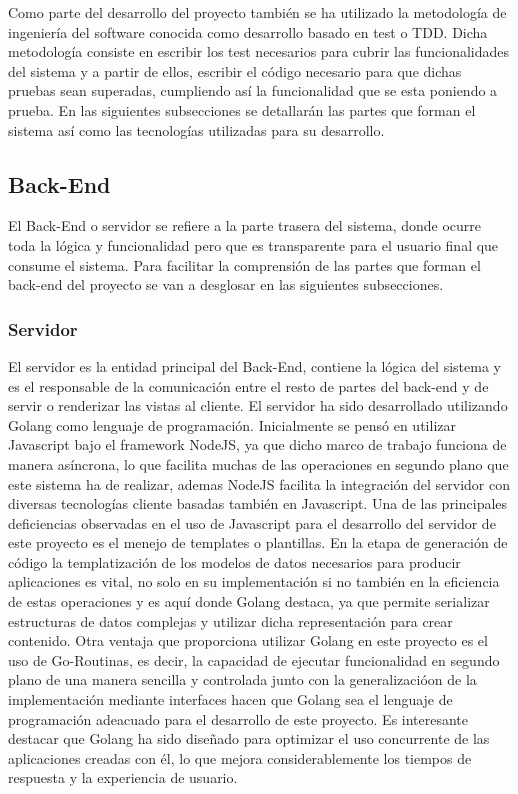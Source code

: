 \documentclass[a4paper,11pt]{book}
\begin{document}
Como parte del desarrollo del proyecto también se ha utilizado la metodología de ingeniería del software conocida como desarrollo basado en test o TDD. Dicha metodología consiste en escribir los test necesarios para cubrir las funcionalidades del sistema y a partir de ellos, escribir el código necesario para que dichas pruebas sean superadas, cumpliendo así la funcionalidad que se esta poniendo a prueba.  En las siguientes subsecciones se detallarán las partes que forman el sistema así como las tecnologías utilizadas para su desarrollo. 

\subsection{Back-End}

El Back-End o servidor se refiere a la parte trasera del sistema, donde ocurre toda la lógica y funcionalidad pero que es transparente para el usuario final que consume el sistema. Para facilitar la comprensión de las partes que forman  el back-end del proyecto se van a desglosar en las siguientes subsecciones.

\subsubsection{Servidor}

El servidor es la entidad principal del Back-End, contiene la lógica del sistema y es el responsable de la comunicación entre el resto de partes del back-end y de servir o renderizar las vistas al cliente.
El servidor ha sido desarrollado utilizando Golang\cite{go} como lenguaje de programación. Inicialmente se pensó en utilizar Javascript bajo el framework NodeJS, ya que dicho marco de trabajo funciona de manera asíncrona, lo que facilita muchas de las operaciones en segundo plano que este sistema ha de realizar, ademas NodeJS facilita la integración del servidor con diversas tecnologías cliente basadas también en Javascript. Una de las principales deficiencias  observadas en el uso de Javascript para el desarrollo del servidor de este proyecto es el menejo de templates o plantillas. 
En la etapa de generación de código la templatización de los modelos de datos necesarios para producir aplicaciones es vital, no solo en su implementación si no también en la eficiencia de estas operaciones y es aquí donde Golang destaca, ya que permite serializar estructuras de datos complejas y utilizar dicha representación para crear contenido. Otra ventaja que proporciona utilizar Golang en este proyecto es el uso de Go-Routinas, es decir, la capacidad de ejecutar funcionalidad en segundo plano de una manera sencilla y controlada junto con la generalizacióon de la implementación mediante interfaces hacen que Golang sea el lenguaje de programación adeacuado para el desarrollo de este proyecto.  Es interesante destacar que Golang ha sido diseñado para optimizar el uso concurrente de las aplicaciones creadas con él, lo que mejora considerablemente los tiempos de respuesta y la experiencia de usuario. 
\end{document}
